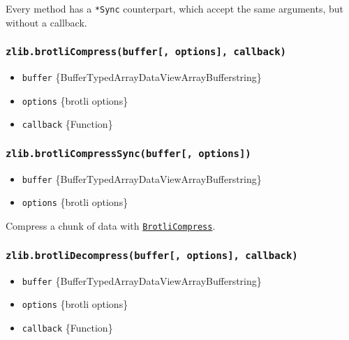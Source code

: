Every method has a \texttt{*Sync} counterpart, which accept the same
arguments, but without a callback.

\subsubsection{\texorpdfstring{\texttt{zlib.brotliCompress(buffer{[},\ options{]},\ callback)}}{zlib.brotliCompress(buffer{[}, options{]}, callback)}}\label{zlib.brotlicompressbuffer-options-callback}

\begin{itemize}
\tightlist
\item
  \texttt{buffer}
  \{Buffer\textbar TypedArray\textbar DataView\textbar ArrayBuffer\textbar string\}
\item
  \texttt{options} \{brotli options\}
\item
  \texttt{callback} \{Function\}
\end{itemize}

\subsubsection{\texorpdfstring{\texttt{zlib.brotliCompressSync(buffer{[},\ options{]})}}{zlib.brotliCompressSync(buffer{[}, options{]})}}\label{zlib.brotlicompresssyncbuffer-options}

\begin{itemize}
\tightlist
\item
  \texttt{buffer}
  \{Buffer\textbar TypedArray\textbar DataView\textbar ArrayBuffer\textbar string\}
\item
  \texttt{options} \{brotli options\}
\end{itemize}

Compress a chunk of data with
\hyperref[class-zlibbrotlicompress]{\texttt{BrotliCompress}}.

\subsubsection{\texorpdfstring{\texttt{zlib.brotliDecompress(buffer{[},\ options{]},\ callback)}}{zlib.brotliDecompress(buffer{[}, options{]}, callback)}}\label{zlib.brotlidecompressbuffer-options-callback}

\begin{itemize}
\tightlist
\item
  \texttt{buffer}
  \{Buffer\textbar TypedArray\textbar DataView\textbar ArrayBuffer\textbar string\}
\item
  \texttt{options} \{brotli options\}
\item
  \texttt{callback} \{Function\}
\end{itemize}

